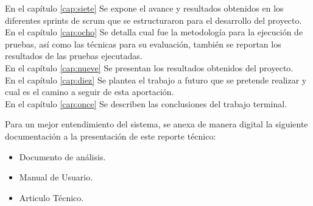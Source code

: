 En el capítulo  \ref{cap:siete} Se expone el avance y resultados obtenidos en los diferentes sprints de scrum que se estructuraron para el desarrollo del proyecto. \\

En el capítulo  \ref{cap:ocho} Se detalla cual fue la metodología para la ejecución de pruebas, así como las técnicas para su evaluación, también se reportan los resultados de las pruebas ejecutadas.\\

En el capítulo \ref{cap:nueve} Se presentan los resultados obtenidos del proyecto.\\

En el capítulo \ref{cap:diez} Se plantea el trabajo a futuro que se pretende realizar y cual es el camino a seguir de esta aportación.\\

En el capítulo \ref{cap:once} Se describen las conclusiones del trabajo terminal.\\

\vspace*{0.3in}

Para un mejor entendimiento del sistema, se anexa de manera digital la siguiente documentación a la presentación de este reporte técnico:

\begin{itemize}
	\item Documento de análisis.
	\item Manual de Usuario.
	\item Articulo Técnico.
\end{itemize}
